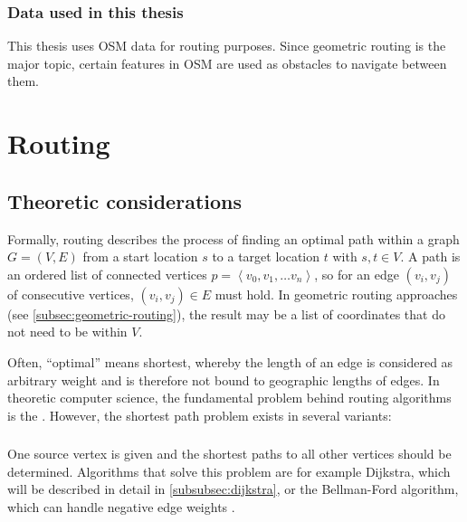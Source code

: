 		\subsubsection{Data used in this thesis}
		
			This thesis uses OSM data for routing purposes.
			Since geometric routing is the major topic, certain features in OSM are used as obstacles to navigate between them.
			

\section{Routing}

	
	\subsection{Theoretic considerations}
	\label{subsec:routing-theoretic-considerations}
	
		Formally, routing describes the process of finding an optimal path within a graph $G=(V, E)$ from a start location $s$ to a target location $t$ with $s, t \in V$.
		A path is an ordered list of connected vertices $p=\left\langle v_0, v_1, \dots v_n \right\rangle$, so for an edge $(v_i, v_j)$ of consecutive vertices, $(v_i, v_j) \in E$ must hold.
		In geometric routing approaches (see \cref{subsec:geometric-routing}), the result may be a list of coordinates that do not need to be within $V$.
		
		Often, \enquote{optimal} means shortest, whereby the length of an edge is considered as arbitrary weight and is therefore not bound to geographic lengths of edges.
		In theoretic computer science, the fundamental problem behind routing algorithms is the .
		However, the shortest path problem exists in several variants\cite[644]{cormen-introduction-to-alg}:
		
		\subsubsection{}
		\label{subsubsec:single-source-shortest-path}
		
			One source vertex is given and the shortest paths to all other vertices should be determined.
			Algorithms that solve this problem are for example Dijkstra, which will be described in detail in \cref{subsubsec:dijkstra}, or the Bellman-Ford algorithm, which can handle negative edge weights \cite[651]{cormen-introduction-to-alg}.
		

